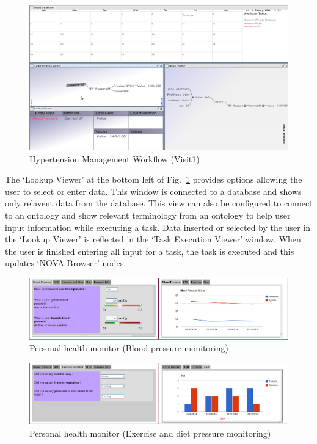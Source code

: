\documentclass[a4paper]{llncs}
\begin{document}
\begin{figure}
  \begin{center}
    \includegraphics[width=\textwidth]{visit1_new.png}
    \caption{Hypertension Management Workflow (Visit1)}
    \label{fig:visit310}
  \end{center}
\end{figure}

The `Lookup Viewer' at the bottom left of Fig.~\ref{fig:visit310} provides options allowing the user to select or enter data. 
This window is connected to a database and shows only relavent data from the database. 
This view can also be configured to connect to an ontology and show relevant terminology from an ontology to help user input information while executing a task. 
Data inserted or selected by the user in the `Lookup Viewer' is reflected in the `Task Execution Viewer' window. 
When the user is finished entering all input for a task, the task is executed and this updates `NOVA Browser' nodes. 


\begin{figure}
  \begin{center}
    \includegraphics[width=\textwidth]{bp_phm.png}
    \caption{Personal health monitor (Blood pressure monitoring)}
    \label{fig:bp_phm}
  \end{center}
\end{figure}

\begin{figure}
  \begin{center}
    \includegraphics[width=\textwidth]{diet_phm.png}
    \caption{Personal health monitor (Exercise and diet pressure monitoring)}
    \label{fig:diet_phm}
  \end{center}
\end{figure}
\end{document}
